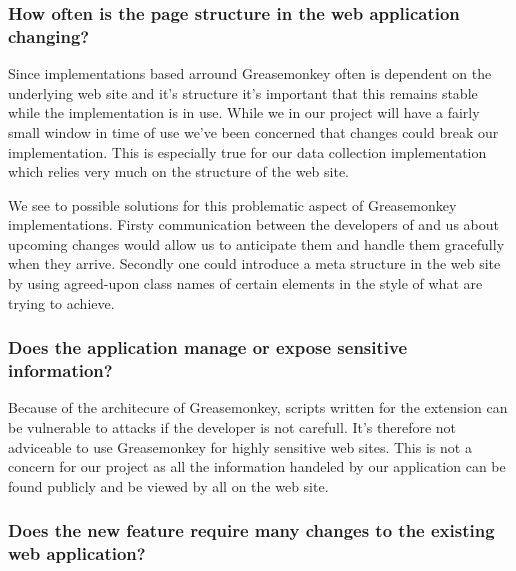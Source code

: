 \subsubsection{How often is the page structure in the web application
  changing?}

Since implementations based arround Greasemonkey often is dependent on the
underlying web site and it's structure it's important that this remains
stable while the implementation is in use. While we in our project
will have a fairly small window in time of use we've been concerned
that changes could break our implementation. This is especially true
for our data collection implementation which relies very much on the structure
of the \urort{} web site.

We see to possible solutions for this problematic aspect of Greasemonkey
implementations. Firsty communication between the developers of
\urort{} and us about upcoming changes would allow us to anticipate
them and handle them gracefully when they arrive. Secondly one could
introduce a meta structure in the web site by using agreed-upon
class names of certain  elements in the style of
what %
are trying to achieve.

\subsubsection{Does the application manage or expose sensitive information?}

Because of the architecure of Greasemonkey, scripts written for the extension
can be vulnerable to attacks if the developer is not carefull. It's
therefore not adviceable to use Greasemonkey for highly sensitive web sites.
This is not a concern for our project as all the information handeled by our
application can be found publicly and be viewed by all on the \urort{}
web site.

\subsubsection{Does the new feature require many changes to the existing web
  application?}

